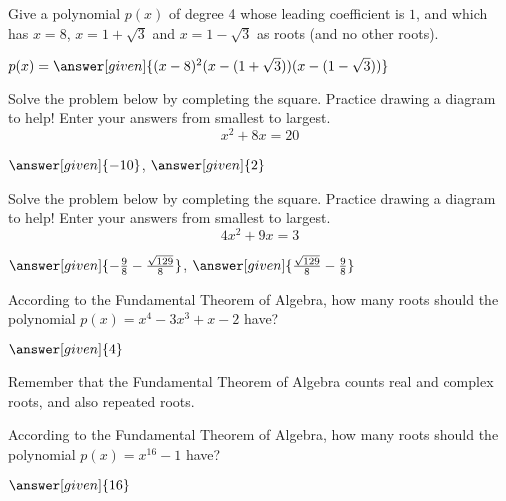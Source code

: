 \documentclass[nooutcomes]{ximera}
\begin{document}
\begin{problem}
Give a polynomial $p(x)$ of degree 4 whose leading coefficient is $1$, and which has $x=8$, $x=1+\sqrt{3}$ and $x = 1-\sqrt{3}$ as roots (and no other roots).

\begin{prompt}
	$p(x) = \answer[given]{(x-8)^2(x-(1+\sqrt{3}))(x-(1-\sqrt{3}))}$
\end{prompt}
\end{problem}



\begin{problem}
Solve the problem below by completing the square.  Practice drawing a diagram to help! Enter your answers from smallest to largest.
\[
x^2 + 8x = 20
\]
\begin{prompt}
	$\answer[given]{-10}$, $\answer[given]{2}$
\end{prompt}
\end{problem}



\begin{problem}
Solve the problem below by completing the square.  Practice drawing a diagram to help! Enter your answers from smallest to largest.
\[
4x^2 + 9x = 3
\]
\begin{prompt}
	$\answer[given]{-\frac{9}{8} - \frac{\sqrt{129}}{8}}$, $\answer[given]{\frac{\sqrt{129}}{8} - \frac{9}{8}}$
\end{prompt}
\end{problem}



\begin{problem}
According to the Fundamental Theorem of Algebra, how many roots should the polynomial $p(x) = x^4 - 3x^3 + x - 2$ have?
\begin{prompt}
	$\answer[given]{4}$
\end{prompt}
\begin{hint}
	Remember that the Fundamental Theorem of Algebra counts real and complex roots, and also repeated roots.
\end{hint}
\end{problem}



\begin{problem}
According to the Fundamental Theorem of Algebra, how many roots should the polynomial $p(x) = x^{16} - 1$ have?
\begin{prompt}
	$\answer[given]{16}$
\end{prompt}
\end{problem}
\end{document}
